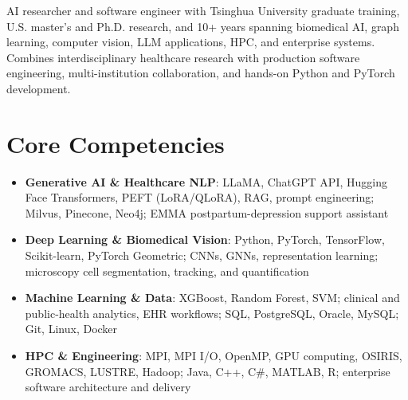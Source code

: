 \documentclass[11pt,a4paper,sans]{moderncv}
\begin{document}
\makecvtitle

\vspace{-2pt}
\small{AI researcher and software engineer with Tsinghua University graduate training, U.S. master's and Ph.D. research, and 10+ years spanning biomedical AI, graph learning, computer vision, LLM applications, HPC, and enterprise systems. Combines interdisciplinary healthcare research with production software engineering, multi-institution collaboration, and hands-on Python and PyTorch development.}

\section{Core Competencies}
\vspace{-1pt}
\begin{itemize}
\item \textbf{Generative AI \& Healthcare NLP}: LLaMA, ChatGPT API, Hugging Face Transformers, PEFT (LoRA/QLoRA), RAG, prompt engineering; Milvus, Pinecone, Neo4j; EMMA postpartum-depression support assistant
\item \textbf{Deep Learning \& Biomedical Vision}: Python, PyTorch, TensorFlow, Scikit-learn, PyTorch Geometric; CNNs, GNNs, representation learning; microscopy cell segmentation, tracking, and quantification
\item \textbf{Machine Learning \& Data}: XGBoost, Random Forest, SVM; clinical and public-health analytics, EHR workflows; SQL, PostgreSQL, Oracle, MySQL; Git, Linux, Docker
\item \textbf{HPC \& Engineering}: MPI, MPI I/O, OpenMP, GPU computing, OSIRIS, GROMACS, LUSTRE, Hadoop; Java, C++, C\#, MATLAB, R; enterprise software architecture and delivery
\end{itemize}
\end{document}
